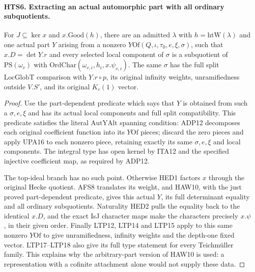 \paragraph{HTS6. Extracting an actual automorphic part with all ordinary subquotients.}
\label{claim:HTS6}
For $J\subseteq\ker x$ and $x.\mathrm{Good}(h)$, there are an
admitted $\lambda$ with $h=\mathrm{htW}(\lambda)$ and one actual
part $Y$ arising from a nonzero
$Y\mathrm{Of}(Q,\iota,\tau_0,e,\xi,\sigma)$, such that
$x.D=\det Y.r$ and every selected local component of $\sigma$
is a subquotient of $\mathrm{PS}(\omega_v)$ with
$\mathrm{OrdChar}(\omega_{v,i},h_i,x.\psi_{v,i})$.
The same $\sigma$ has the full split $\mathrm{LocGlobT}$
comparison with $Y.r\circ p$, its original infinity weights,
unramifiedness outside $V.S'$, and its original $K_c(1)$ vector.
\begin{proof}
Use the part-dependent predicate which says that $Y$ is obtained
from such a $\sigma,e,\xi$ and has its actual local components
and full split compatibility.  This predicate satisfies the
literal $\mathrm{AutYAlt}$ spanning condition: ADP12 decomposes
each original coefficient function into its $Y\mathrm{Of}$
pieces; discard the zero pieces and apply UPA16 to each nonzero
piece, retaining exactly its same $\sigma,e,\xi$ and local
components.  The integral type has open kernel by ITA12 and
the specified injective coefficient map, as required by ADP12.

The top-ideal branch has no such point.  Otherwise HED1 factors
$x$ through the original Hecke quotient.  AFS8 translates its
weight, and HAW10, with the just proved part-dependent predicate,
gives this actual $Y$, its full determinant equality and all
ordinary subquotients.  Naturality HED2 pulls the equality back
to the identical $x.D$, and the exact IsJ character maps make
the characters precisely $x.\psi$, in their given order.
Finally LTP12, LTP14 and LTP15 apply to this same nonzero
$Y\mathrm{Of}$ to give unramifiedness, infinity weights and
the depth-one fixed vector.  LTP17--LTP18 also give its full
type statement for every Teichm\"uller family.  This explains
why the arbitrary-part version of HAW10 is used: a representation
with a cofinite attachment alone would not supply these data.
\end{proof}

